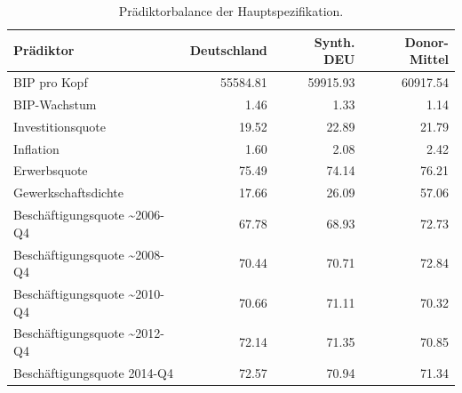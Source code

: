 \begin{table}[!h]
\centering
\caption{\label{tab:praediktorbalance}Prädiktorbalance der Hauptspezifikation.}
\centering
\begin{tabular}[t]{lrrr}
\toprule
Prädiktor & Deutschland & Synth. DEU & Donor-Mittel\\
\midrule
BIP pro Kopf & 55584.81 & 59915.93 & 60917.54\\
BIP-Wachstum & 1.46 & 1.33 & 1.14\\
Investitionsquote & 19.52 & 22.89 & 21.79\\
Inflation & 1.60 & 2.08 & 2.42\\
Erwerbsquote & 75.49 & 74.14 & 76.21\\
\addlinespace
Gewerkschaftsdichte & 17.66 & 26.09 & 57.06\\
Beschäftigungsquote \textasciitilde{}2006-Q4 & 67.78 & 68.93 & 72.73\\
Beschäftigungsquote \textasciitilde{}2008-Q4 & 70.44 & 70.71 & 72.84\\
Beschäftigungsquote \textasciitilde{}2010-Q4 & 70.66 & 71.11 & 70.32\\
Beschäftigungsquote \textasciitilde{}2012-Q4 & 72.14 & 71.35 & 70.85\\
\addlinespace
Beschäftigungsquote 2014-Q4 & 72.57 & 70.94 & 71.34\\
\bottomrule
\end{tabular}
\end{table}
